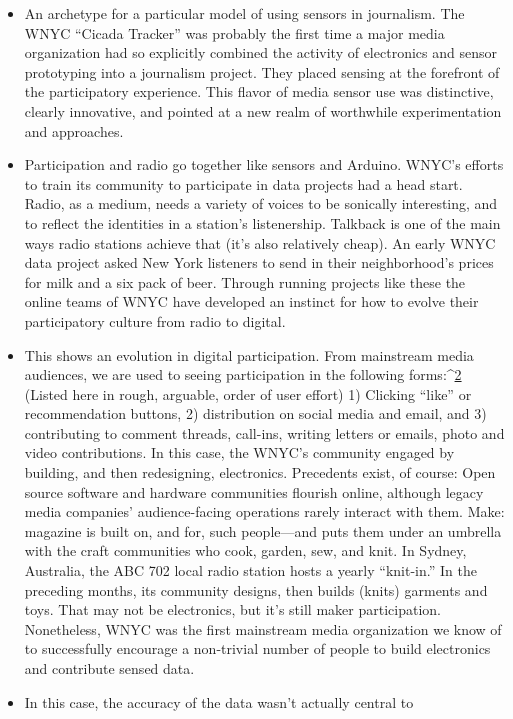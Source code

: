 \begin{itemize}
\item An archetype for a particular model of using sensors
in journalism.
The WNYC ``Cicada Tracker'' was probably the first time a major
media organization had so explicitly combined the activity of electronics
and sensor prototyping into a journalism project. They placed
sensing at the forefront of the participatory experience. This flavor of
media sensor use was distinctive, clearly innovative, and pointed at a
new realm of worthwhile experimentation and approaches.
\item Participation and radio go together like sensors and Arduino.
WNYC's efforts to train its community to participate in data projects
had a head start. Radio, as a medium, needs a variety of voices to be
sonically interesting, and to reflect the identities in a station's listenership.
Talkback is one of the main ways radio stations achieve that (it's
also relatively cheap). An early WNYC data project asked New York
listeners to send in their neighborhood's prices for milk and a six
pack of beer. Through running projects like these the online teams of
WNYC have developed an instinct for how to evolve their participatory
culture from radio to digital.
\item This shows an evolution in digital participation.
From mainstream media audiences, we are used to seeing participation
in the following forms:^{\href{#endnotes-wnyc}{2}} (Listed here in rough, arguable, order of
user effort) 1) Clicking ``like'' or recommendation buttons, 2) distribution
on social media and email, and 3) contributing to comment
threads, call-ins, writing letters or emails, photo and video contributions.
In this case, the WNYC's community engaged by building, and
then redesigning, electronics. Precedents exist, of course: Open
source software and hardware communities flourish online, although
legacy media companies' audience-facing operations rarely interact
with them. Make: magazine is built on, and for, such people—and
puts them under an umbrella with the craft communities who cook,
garden, sew, and knit.
In Sydney, Australia, the ABC 702 local radio station hosts a yearly
``knit-in.'' In the preceding months, its community designs, then builds
(knits) garments and toys. That may not be electronics, but it's still
maker participation. Nonetheless, WNYC was the first mainstream
media organization we know of to successfully encourage a non-trivial
number of people to build electronics and contribute sensed data.
\item In this case, the accuracy of the data wasn't actually central to

\end{itemize}
